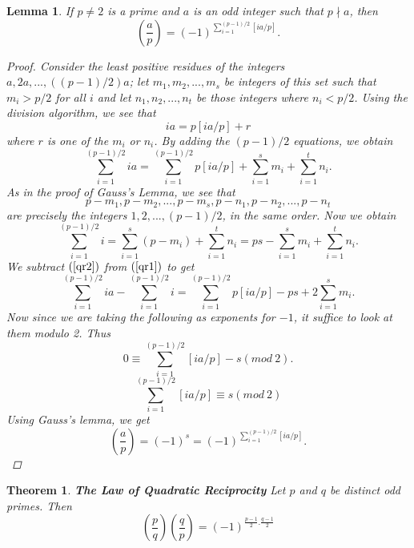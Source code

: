 \documentclass[12pt,letterpaper]{book}
\newtheorem{theorem}{Theorem}
\newtheorem{lemma}{Lemma}
\begin{document}
\begin{lemma}
If $p\neq 2$ is a prime and $a$ is an odd integer such that $p\nmid
a$, then
\begin{equation*}
\left(\frac{a}{p}\right)=(-1)^{\sum_{i=1}^{(p-1)/2}[ia/p]}.
\end{equation*}

\begin{proof}
Consider the least positive residues of the integers $a,
2a,...,((p-1)/2)a$; let $m_1,m_2,...,m_s$ be integers of this set
such that $m_i>p/2$ for all $i$ and let $n_1,n_2,...,n_t$ be those
integers where $n_i<p/2$. Using the division algorithm, we see that
\begin{equation*}
ia=p[ia/p]+r
\end{equation*}
where $r$ is one of the $m_i$ or $n_i$.  By adding the $(p-1)/2$
equations, we obtain
\begin{equation}\label{qr1}
\sum_{i=1}^{(p-1)/2}ia=\sum_{i=1}^{(p-1)/2}p[ia/p]+\sum_{i=1}^sm_i+\sum_{i=1}^tn_i.
\end{equation}
As in the proof of Gauss's Lemma, we see that
\begin{equation*}
p-m_1,p-m_2,...,p-m_s,p-n_1,p-n_2,...,p-n_t
\end{equation*}
are precisely the integers $1,2,...,(p-1)/2$, in the same order. Now
we obtain
\begin{equation}\label{qr2}
\sum_{i=1}^{(p-1)/2}i=\sum_{i=1}^s(p-m_i)+\sum_{i=1}^tn_i=ps-\sum_{i=1}^sm_i+\sum_{i=1}^tn_i.
\end{equation}
We subtract $(\ref{qr2})$ from $(\ref{qr1})$ to get
\begin{equation*}
\sum_{i=1}^{(p-1)/2}ia-\sum_{i=1}^{(p-1)/2}i=\sum_{i=1}^{(p-1)/2}p[ia/p]-ps+2\sum_{i=1}^sm_i.
\end{equation*}
Now since we are taking the following as exponents for $-1$, it
suffice to look at them modulo 2.  Thus
\begin{equation*}
0\equiv \sum_{i=1}^{(p-1)/2}[ia/p]-s(mod \ 2).
\end{equation*}
\begin{equation*}
\sum_{i=1}^{(p-1)/2}[ia/p]\equiv s(mod \ 2)
\end{equation*}
Using Gauss's lemma, we get
\begin{equation*}
\left(\frac{a}{p}\right)=(-1)^s=(-1)^{\sum_{i=1}^{(p-1)/2}[ia/p]}.
\end{equation*}
\end{proof}
\end{lemma}
\begin{theorem}\textbf{The Law of Quadratic Reciprocity}
Let $p$ and $q$ be distinct odd primes.  Then
\begin{equation*}
\left(\frac{p}{q}\right)\left(\frac{q}{p}\right)=(-1)^{\frac{p-1}{2}.\frac{q-1}{2}}
\end{equation*}
\end{theorem}
\end{document}
